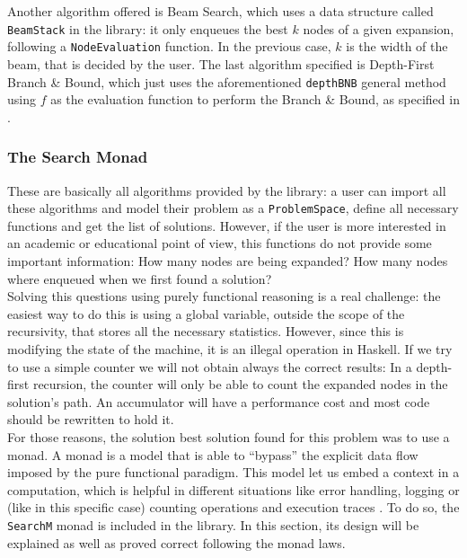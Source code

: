 Another algorithm offered is Beam Search, which uses a data structure called
\texttt{BeamStack} in the library: it only enqueues the best $k$ nodes of a
given expansion, following a \texttt{NodeEvaluation} function. In the previous
case, $k$ is the width of the beam, that is decided by the user. The last
algorithm specified is Depth-First Branch \& Bound, which just uses the
aforementioned \texttt{depthBNB} general method using $f$ as the evaluation
function to perform the Branch \& Bound, as specified in
\cite{zhang-1995-bnb}.\\


\subsubsection{The Search Monad}

These are basically all algorithms provided by the library: a user can import
all these algorithms and model their problem as a \texttt{ProblemSpace}, define
all necessary functions and get the list of solutions. However, if the user is
more interested in an academic or educational point of view, this functions do
not provide some important information: How many nodes are being expanded? How
many nodes where enqueued when we first found a solution?\\

Solving this questions using purely functional reasoning is a real challenge:
the easiest way to do this is using a global variable, outside the scope of the
recursivity, that stores all the necessary statistics. However, since this is
modifying the state of the machine, it is an illegal operation in Haskell. If
we try to use a simple counter we will not obtain always the correct results:
In a depth-first recursion, the counter will only be able to count the expanded
nodes in the solution's path. An accumulator will have a performance cost and
most code should be rewritten to hold it.\\

For those reasons, the solution best solution found for this problem was to use
a monad. A monad is a model that is able to ``bypass'' the explicit data flow
imposed by the pure functional paradigm. This model let us embed a context in a
computation, which is helpful in different situations like error handling,
logging or (like in this specific case) counting operations and execution
traces \cite{wadler-1993-monad}. To do so, the \texttt{SearchM} monad is
included in the library. In this section, its design will be explained as well
as proved correct following the monad laws.\\

